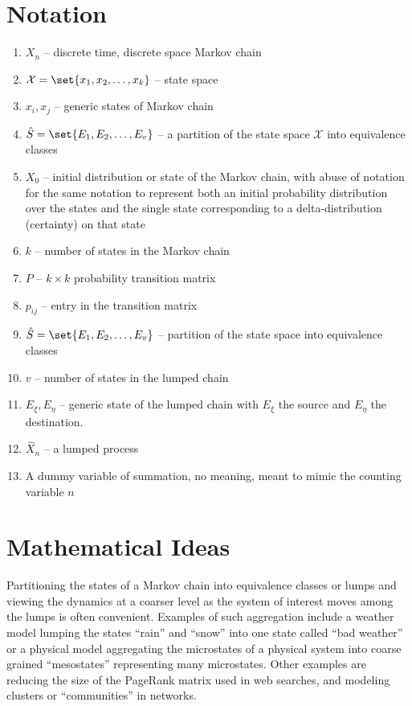 \documentclass[12pt]{article}
\begin{document}
\section*{Notation}
\begin{enumerate}
    \item
        \( X_n \) -- discrete time, discrete space Markov chain
    \item
        \( \mathcal{X} = \set{x_1, x_2, \dots, x_k} \) -- state space
    \item
        \( x_i, x_j \) -- generic states of Markov chain
      \item   \( \hat{S} = \set{E_1, E_2, \dots, E_v} \) -- a
        partition of the
    state space \( \mathcal{X} \) into equivalence classes
    \item
        \( X_0 \) -- initial distribution or state of the Markov chain,
        with abuse of notation for the same notation to represent both
        an initial probability distribution over the states and the
        single state corresponding to a delta-distribution (certainty)
        on that state
    \item
        \( k \) -- number of states in the Markov chain
    \item
        \( P \) -- \( k \times k \) probability transition matrix
    \item
        \( p_{ij} \) -- entry in the transition matrix
    \item
        \( \hat{S} = \set{E_1, E_2, \dots, E_v} \) -- partition of the
        state space into equivalence classes
    \item
        \( v \) -- number of states in the lumped chain
    \item
        \( E_{\xi}, E_{\eta} \) -- generic state of the lumped chain
        with \( E_{\xi} \) the source and \( E_{\eta} \) the
        destination.
    \item
        \( \hat{X}_n \) -- a lumped process
    \item
        A dummy variable of summation, no meaning, meant to mimic the
        counting variable \( n \)
\end{enumerate}
\hr

\section*{Mathematical Ideas}

Partitioning the states of a Markov chain into equivalence classes or
lumps and viewing the dynamics at a coarser level as the system of
interest moves among the lumps is often convenient.  Examples of such
aggregation include a weather model lumping the states ``rain'' and
``snow'' into one state called ``bad weather'' or a physical model
aggregating the microstates of a physical system into coarse grained
``mesostates'' representing many microstates.  Other examples are
reducing the size of the PageRank matrix used in web searches, and
modeling clusters or ``communities'' in networks.
\end{document}
